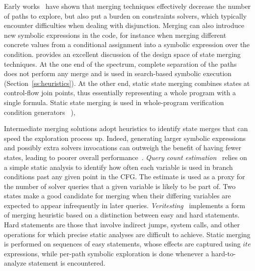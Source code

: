  Early works~\cite{G-POPL07,HSS-RV09} have shown that merging techniques effectively decrease the number of paths to explore, but also put a burden on constraints solvers, which typically encounter difficulties when dealing with disjunction. Merging can also introduce new symbolic expressions in the code, for instance when merging different concrete values from a conditional assignment into a symbolic expression over the condition. \cite{KKB-PLDI12} provides an excellent discussion of the design space of state merging techniques. At the one end of the spectrum, complete separation of the paths does not perform any merge and is used in search-based symbolic execution (Section~\ref{ss:heuristics}). At the other end, static state merging combines states at control-flow join points, thus essentially representing a whole program with a single formula. Static state merging is used in whole-program verification condition generators ~\cite{SATURN-POPL05,CALYSTO-ICSE08}), 



 Intermediate merging solutions adopt heuristics to identify state merges that can speed the exploration process up. Indeed, generating larger symbolic expressions and possibly extra solvers invocations can outweigh the benefit of having fewer states, leading to poorer overall performance~\cite{HSS-RV09,KKB-PLDI12}. {\em Query count estimation}~\cite{KKB-PLDI12} relies on a simple static analysis to identify how often each variable is used in branch conditions past any given point in the CFG. The estimate is used as a proxy for the number of solver queries that a given variable is likely to be part of. Two states make a good candidate for merging when their differing variables are expected to appear infrequently in later queries. {\em Veritesting}~\cite{VERITESTING-ICSE14} implements a form of merging heuristic based on a distinction between easy and hard statements. Hard statements are those that involve indirect jumps, system calls, and other operations for which precise static analyses are difficult to achieve. Static merging is performed on sequences of easy statements, %
whose effects are captured using $ite$ expressions, 
while per-path symbolic exploration is done whenever a hard-to-analyze statement is encountered. 

